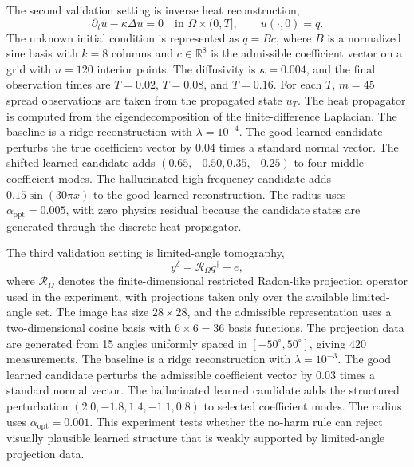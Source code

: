 \documentclass{article}
\numberwithin{equation}{section}
\theoremstyle{definition}
\begin{document}
The second validation setting is inverse heat reconstruction,
\begin{equation}
\partial_t u-\kappa\Delta u=0
\quad \text{in } \Omega\times(0,T],
\qquad
u(\cdot,0)=q .
\label{eq:inverse-heat}
\end{equation}
The unknown initial condition is represented as \(q=Bc\), where \(B\) is a normalized sine basis with \(k=8\) columns and \(c\in\mathbb R^8\) is the admissible coefficient vector on a grid with \(n=120\) interior points. The diffusivity is \(\kappa=0.004\), and the final observation times are \(T=0.02\), \(T=0.08\), and \(T=0.16\). For each \(T\), \(m=45\) spread observations are taken from the propagated state \(u_T\). The heat propagator is computed from the eigendecomposition of the finite-difference Laplacian. The baseline is a ridge reconstruction with \(\lambda=10^{-4}\). The good learned candidate perturbs the true coefficient vector by \(0.04\) times a standard normal vector. The shifted learned candidate adds \((0.65,-0.50,0.35,-0.25)\) to four middle coefficient modes. The hallucinated high-frequency candidate adds \(0.15\sin(30\pi x)\) to the good learned reconstruction. The radius uses \(\alpha_{\mathrm{opt}}=0.005\), with zero physics residual because the candidate states are generated through the discrete heat propagator.

The third validation setting is limited-angle tomography,
\begin{equation}
y^\delta=\mathcal R_\Omega q^\dagger+e ,
\label{eq:limited-angle-tomography}
\end{equation}
where \(\mathcal R_\Omega\) denotes the finite-dimensional restricted Radon-like projection operator used in the experiment, with projections taken only over the available limited-angle set. The image has size \(28\times28\), and the admissible representation uses a two-dimensional cosine basis with \(6\times6=36\) basis functions. The projection data are generated from 15 angles uniformly spaced in \([-50^\circ,50^\circ]\), giving \(420\) measurements. The baseline is a ridge reconstruction with \(\lambda=10^{-3}\). The good learned candidate perturbs the admissible coefficient vector by \(0.03\) times a standard normal vector. The hallucinated learned candidate adds the structured perturbation \((2.0,-1.8,1.4,-1.1,0.8)\) to selected coefficient modes. The radius uses \(\alpha_{\mathrm{opt}}=0.001\). This experiment tests whether the no-harm rule can reject visually plausible learned structure that is weakly supported by limited-angle projection data.
\end{document}
